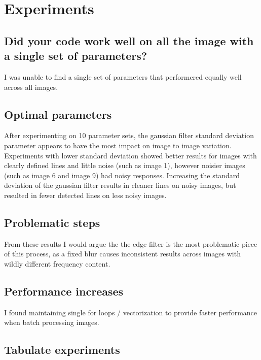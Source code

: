 \documentclass[12pt]{article}
\begin{document}
\subsection{}
\newpage
\subsection{}

\newpage
\section{Experiments}
\subsection{Did your code work well on all the image with a single set of parameters? }
I was unable to find a single set of parameters that performered equally well across all images.

\newpage
\subsection{Optimal parameters}
After experimenting on 10 parameter sets, the gaussian filter standard deviation parameter appears to have the most impact on image to image variation. Experiments with lower standard deviation showed better results for images with clearly defined lines and little noise (such as image 1), however noisier images (such as image 6 and image 9) had noisy responses.
Increasing the standard deviation of the gaussian filter results in cleaner lines on noisy images, but resulted in fewer detected lines on less noisy images.

\newpage
\subsection{Problematic steps}
From these results I would argue the the edge filter is the most problematic piece of this process, as a fixed blur causes inconsistent results across images with wildly different frequency content.

\newpage
\subsection{Performance increases}
I found maintaining single for loops / vectorization to provide faster performance when batch processing images.

\newpage
\subsection{Tabulate experiments}
\end{document}
